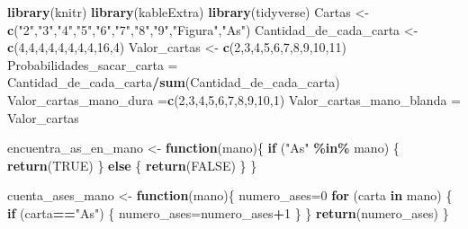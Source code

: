 \documentclass[12pt,a4paper,]{book}
\newenvironment{Shaded}{\begin{snugshade}}{\end{snugshade}}
\newcommand{\ConstantTok}[1]{\textcolor[rgb]{0.56,0.35,0.01}{#1}}
\newcommand{\ControlFlowTok}[1]{\textcolor[rgb]{0.13,0.29,0.53}{\textbf{#1}}}
\newcommand{\DecValTok}[1]{\textcolor[rgb]{0.00,0.00,0.81}{#1}}
\newcommand{\FunctionTok}[1]{\textcolor[rgb]{0.13,0.29,0.53}{\textbf{#1}}}
\newcommand{\NormalTok}[1]{#1}
\newcommand{\OtherTok}[1]{\textcolor[rgb]{0.56,0.35,0.01}{#1}}
\newcommand{\SpecialCharTok}[1]{\textcolor[rgb]{0.81,0.36,0.00}{\textbf{#1}}}
\newcommand{\StringTok}[1]{\textcolor[rgb]{0.31,0.60,0.02}{#1}}
\numberwithin{dummy}{section}
\theoremstyle{ocrenumbox}
\theoremstyle{blacknumex}
\theoremstyle{blacknumbox}
\theoremstyle{ocrenum}
\theoremstyle{ocrenum}
\begin{document}
\begin{Shaded}
\begin{Highlighting}[]
\FunctionTok{library}\NormalTok{(knitr)}
\FunctionTok{library}\NormalTok{(kableExtra)}
\FunctionTok{library}\NormalTok{(tidyverse)}
\NormalTok{Cartas }\OtherTok{\textless{}{-}} \FunctionTok{c}\NormalTok{(}\StringTok{"2"}\NormalTok{,}\StringTok{"3"}\NormalTok{,}\StringTok{"4"}\NormalTok{,}\StringTok{"5"}\NormalTok{,}\StringTok{"6"}\NormalTok{,}\StringTok{"7"}\NormalTok{,}\StringTok{"8"}\NormalTok{,}\StringTok{"9"}\NormalTok{,}\StringTok{"Figura"}\NormalTok{,}\StringTok{"As"}\NormalTok{)}
\NormalTok{Cantidad\_de\_cada\_carta }\OtherTok{\textless{}{-}} \FunctionTok{c}\NormalTok{(}\DecValTok{4}\NormalTok{,}\DecValTok{4}\NormalTok{,}\DecValTok{4}\NormalTok{,}\DecValTok{4}\NormalTok{,}\DecValTok{4}\NormalTok{,}\DecValTok{4}\NormalTok{,}\DecValTok{4}\NormalTok{,}\DecValTok{4}\NormalTok{,}\DecValTok{16}\NormalTok{,}\DecValTok{4}\NormalTok{)}
\NormalTok{Valor\_cartas }\OtherTok{\textless{}{-}} \FunctionTok{c}\NormalTok{(}\DecValTok{2}\NormalTok{,}\DecValTok{3}\NormalTok{,}\DecValTok{4}\NormalTok{,}\DecValTok{5}\NormalTok{,}\DecValTok{6}\NormalTok{,}\DecValTok{7}\NormalTok{,}\DecValTok{8}\NormalTok{,}\DecValTok{9}\NormalTok{,}\DecValTok{10}\NormalTok{,}\DecValTok{11}\NormalTok{)}
\NormalTok{Probabilidades\_sacar\_carta }\OtherTok{=}\NormalTok{ Cantidad\_de\_cada\_carta}\SpecialCharTok{/}\FunctionTok{sum}\NormalTok{(Cantidad\_de\_cada\_carta)}
\NormalTok{Valor\_cartas\_mano\_dura }\OtherTok{=}\FunctionTok{c}\NormalTok{(}\DecValTok{2}\NormalTok{,}\DecValTok{3}\NormalTok{,}\DecValTok{4}\NormalTok{,}\DecValTok{5}\NormalTok{,}\DecValTok{6}\NormalTok{,}\DecValTok{7}\NormalTok{,}\DecValTok{8}\NormalTok{,}\DecValTok{9}\NormalTok{,}\DecValTok{10}\NormalTok{,}\DecValTok{1}\NormalTok{)}
\NormalTok{Valor\_cartas\_mano\_blanda }\OtherTok{=}\NormalTok{ Valor\_cartas}

\NormalTok{encuentra\_as\_en\_mano }\OtherTok{\textless{}{-}} \ControlFlowTok{function}\NormalTok{(mano)\{}
  \ControlFlowTok{if}\NormalTok{ (}\StringTok{"As"} \SpecialCharTok{\%in\%}\NormalTok{ mano) \{}
    \FunctionTok{return}\NormalTok{(}\ConstantTok{TRUE}\NormalTok{)}
\NormalTok{  \} }\ControlFlowTok{else}\NormalTok{ \{}
    \FunctionTok{return}\NormalTok{(}\ConstantTok{FALSE}\NormalTok{)}
\NormalTok{  \}}
\NormalTok{\}}

\NormalTok{cuenta\_ases\_mano }\OtherTok{\textless{}{-}} \ControlFlowTok{function}\NormalTok{(mano)\{}
\NormalTok{  numero\_ases}\OtherTok{=}\DecValTok{0}
  \ControlFlowTok{for}\NormalTok{ (carta }\ControlFlowTok{in}\NormalTok{ mano) \{}
    \ControlFlowTok{if}\NormalTok{ (carta}\SpecialCharTok{==}\StringTok{"As"}\NormalTok{) \{}
\NormalTok{      numero\_ases}\OtherTok{=}\NormalTok{numero\_ases}\SpecialCharTok{+}\DecValTok{1}
\NormalTok{    \}}
\NormalTok{  \}}
  \FunctionTok{return}\NormalTok{(numero\_ases)}
\NormalTok{\}}



\end{Highlighting}
\end{Shaded}
\end{document}
